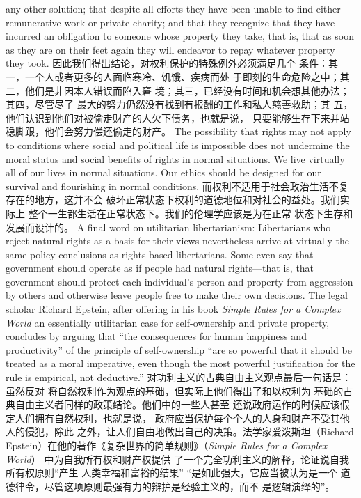 \begin{paracol}{2}
any other solution; that despite all efforts they have been unable to find either remunerative work or private charity; and
that they recognize that they have incurred an obligation to
someone whose property they take, that is, that as soon as they
are on their feet again they will endeavor to repay whatever
property they took.
\switchcolumn
因此我们得出结论，对权利保护的特殊例外必须满足几个
条件：其一，一个人或者更多的人面临寒冷、饥饿、疾病而处
于即刻的生命危险之中；其二，他们是非因本人错误而陷入窘
境；其三，已经没有时间和机会想其他办法；其四，尽管尽了
最大的努力仍然没有找到有报酬的工作和私人慈善救助；其
五，他们认识到他们对被偷走财产的人欠下债务，也就是说，
只要能够生存下来并站稳脚跟，他们会努力偿还偷走的财产。
\switchcolumn*
The possibility that rights may not apply to conditions where
social and political life is impossible does not undermine the
moral status and social benefits of rights in normal situations.
We live virtually all of our lives in normal situations. Our ethics
should be designed for our survival and flourishing in normal
conditions.
\switchcolumn
而权利不适用于社会政治生活不复存在的地方，这并不会
破坏正常状态下权利的道德地位和对社会的益处。我们实际上
整个一生都生活在正常状态下。我们的伦理学应该是为在正常
状态下生存和发展而设计的。
\switchcolumn*
A final word on utilitarian libertarianism: Libertarians who
reject natural rights as a basis for their views nevertheless arrive at virtually the same policy conclusions as rights-based libertarians. Some even say that government should operate as if
people had natural rights---that is, that government should
protect each individual's person and property from aggression
by others and otherwise leave people free to make their own
decisions. The legal scholar Richard Epstein, after offering in
his book \textit{Simple Rules for a Complex World} an essentially utilitarian case for self-ownership and private property, concludes by
arguing that ``the consequences for human happiness and productivity'' of the principle of self-ownership ``are so powerful
that it should be treated as a moral imperative, even though
the most powerful justification for the rule is empirical, not deductive.''
\switchcolumn
对功利主义的古典自由主义观点最后一句话是：虽然反对
将自然权利作为观点的基础，但实际上他们得出了和以权利为
基础的古典自由主义者同样的政策结论。他们中的一些人甚至
还说政府运作的时候应该假定人们拥有自然权利，也就是说，
政府应当保护每个个人的人身和财产不受其他人的侵犯，除此
之外，让人们自由地做出自己的决策。法学家爱泼斯坦（Richard Epstein）在他的著作《复杂世界的简单规则》（\textit{Simple Rules for a Complex World}） 中为自我所有权和财产权提供
了一个完全功利主义的解释，论证说自我所有权原则“产生
人类幸福和富裕的结果” “是如此强大，它应当被认为是一个
道德律令，尽管这项原则最强有力的辩护是经验主义的，而不
是逻辑演绎的”。


\end{paracol}
